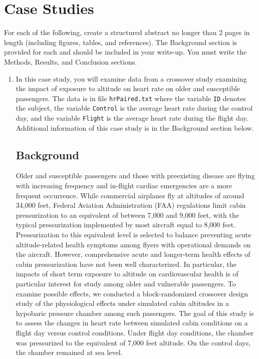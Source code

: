 \documentclass{article}
\begin{document}
	\section*{Case Studies}
	For each of the following, create a structured abstract no longer than 2 pages in length (including figures, tables, and references). The Background section is provided for each and should be included in your write-up. You must write the Methods, Results, and Conclusion sections.
	\begin{enumerate}
		\item In this case study, you will examine data from a crossover study examining the impact of exposure to altitude on heart rate on older and susceptible passengers. The data is in file \texttt{hrPaired.txt} where the variable \texttt{ID} denotes the subject, the variable \texttt{Control} is the average heart rate during the control day, and the variable \texttt{Flight} is the average heart rate during the flight day. Additional information of this case study is in the Background section below.

		\newpage
		\subsection*{Background}
		
		Older and susceptible passengers and those with preexisting disease are flying with increasing frequency and in-flight cardiac emergencies are a more frequent occurrence. While commercial airplanes fly at altitudes of around 34,000 feet, Federal Aviation Administration (FAA) regulations limit cabin pressurization to an equivalent of between 7,000 and 9,000 feet, with the typical pressurization implemented by most aircraft equal to 8,000 feet. Pressurization to this equivalent level is selected to balance preventing acute altitude-related health symptoms among flyers with operational demands on the aircraft. However, comprehensive acute and longer-term health effects of cabin pressurization have not been well characterized. In particular, the impacts of short term exposure to altitude on cardiovascular health is of particular interest for study among older and vulnerable passengers. To examine possible effects, we conducted a block-randomized crossover design study of the physiological effects under simulated cabin altitudes in a hypobaric pressure chamber among such passengers. The goal of this study is to assess the changes in heart rate between simulated cabin conditions on a flight day versus control conditions. Under flight day conditions, the chamber was pressurized to the equivalent of 7,000 feet altitude. On the control days, the chamber remained at sea level.


\end{enumerate}
\end{document}
